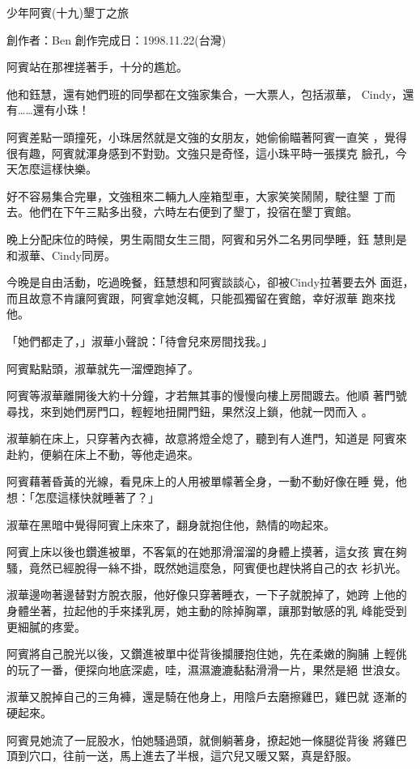 



少年阿賓(十九)墾丁之旅

創作者：Ben
創作完成日：1998.11.22(台灣)


阿賓站在那裡搓著手，十分的尷尬。

他和鈺慧，還有她們班的同學都在文強家集合，一大票人，包括淑華，
Cindy，還有……還有小珠！

阿賓差點一頭撞死，小珠居然就是文強的女朋友，她偷偷瞄著阿賓一直笑
，覺得很有趣，阿賓就渾身感到不對勁。文強只是奇怪，這小珠平時一張撲克
臉孔，今天怎麼這樣快樂。

好不容易集合完畢，文強租來二輛九人座箱型車，大家笑笑鬧鬧，駛往墾
丁而去。他們在下午三點多出發，六時左右便到了墾丁，投宿在墾丁賓館。

晚上分配床位的時候，男生兩間女生三間，阿賓和另外二名男同學睡，鈺
慧則是和淑華、Cindy同房。

今晚是自由活動，吃過晚餐，鈺慧想和阿賓談談心，卻被Cindy拉著要去外
面逛，而且故意不肯讓阿賓跟，阿賓拿她沒輒，只能孤獨留在賓館，幸好淑華
跑來找他。

「她們都走了，」淑華小聲說：「待會兒來房間找我。」

阿賓點點頭，淑華就先一溜煙跑掉了。

阿賓等淑華離開後大約十分鐘，才若無其事的慢慢向樓上房間踱去。他順
著門號尋找，來到她們房門口，輕輕地扭開門鈕，果然沒上鎖，他就一閃而入
。

淑華躺在床上，只穿著內衣褲，故意將燈全熄了，聽到有人進門，知道是
阿賓來赴約，便躺在床上不動，等他走過來。

阿賓藉著昏黃的光線，看見床上的人用被單幪著全身，一動不動好像在睡
覺，他想：「怎麼這樣快就睡著了？」

淑華在黑暗中覺得阿賓上床來了，翻身就抱住他，熱情的吻起來。

阿賓上床以後也鑽進被單，不客氣的在她那滑溜溜的身體上摸著，這女孩
實在夠騷，竟然已經脫得一絲不掛，既然她這麼急，阿賓便也趕快將自己的衣
衫扒光。

淑華邊吻著邊替對方脫衣服，他好像只穿著睡衣，一下子就脫掉了，她跨
上他的身體坐著，拉起他的手來揉乳房，她主動的除掉胸罩，讓那對敏感的乳
峰能受到更細膩的疼愛。

阿賓將自己脫光以後，又鑽進被單中從背後攔腰抱住她，先在柔嫩的胸脯
上輕佻的玩了一番，便探向地底深處，哇，濕濕漉漉黏黏滑滑一片，果然是絕
世浪女。

淑華又脫掉自己的三角褲，還是騎在他身上，用陰戶去磨擦雞巴，雞巴就
逐漸的硬起來。

阿賓見她流了一屁股水，怕她騷過頭，就側躺著身，撩起她一條腿從背後
將雞巴頂到穴口，往前一送，馬上進去了半根，這穴兒又暖又緊，真是舒服。

